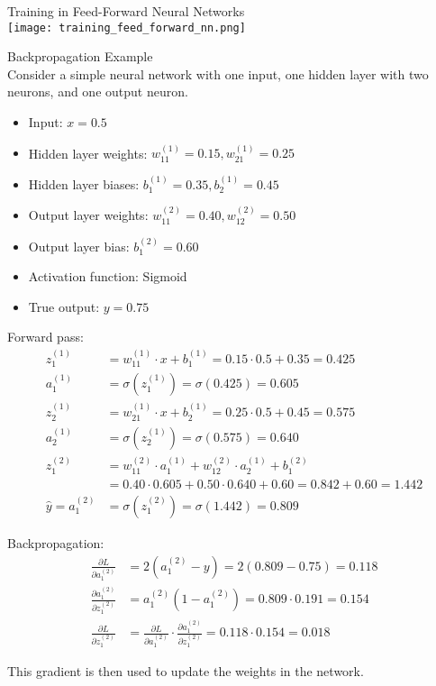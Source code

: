 \begin{theorem}{Training in Feed-Forward Neural Networks}\\
    \texttt{[image: training\_feed\_forward\_nn.png]}    
\end{theorem}

\begin{example2}{Backpropagation Example}\\
Consider a simple neural network with one input, one hidden layer with two neurons, and one output neuron.
\begin{itemize}
    \item Input: $x = 0.5$
    \item Hidden layer weights: $w^{(1)}_{11} = 0.15, w^{(1)}_{21} = 0.25$
    \item Hidden layer biases: $b^{(1)}_1 = 0.35, b^{(1)}_2 = 0.45$
    \item Output layer weights: $w^{(2)}_{11} = 0.40, w^{(2)}_{12} = 0.50$
    \item Output layer bias: $b^{(2)}_1 = 0.60$
    \item Activation function: Sigmoid
    \item True output: $y = 0.75$
\end{itemize}
\tcblower
Forward pass:
\begin{align*}
z^{(1)}_1 &= w^{(1)}_{11} \cdot x + b^{(1)}_1 = 0.15 \cdot 0.5 + 0.35 = 0.425\\
a^{(1)}_1 &= \sigma(z^{(1)}_1) = \sigma(0.425) = 0.605\\
z^{(1)}_2 &= w^{(1)}_{21} \cdot x + b^{(1)}_2 = 0.25 \cdot 0.5 + 0.45 = 0.575\\
a^{(1)}_2 &= \sigma(z^{(1)}_2) = \sigma(0.575) = 0.640\\
z^{(2)}_1 &= w^{(2)}_{11} \cdot a^{(1)}_1 + w^{(2)}_{12} \cdot a^{(1)}_2 + b^{(2)}_1\\
&= 0.40 \cdot 0.605 + 0.50 \cdot 0.640 + 0.60 = 0.842 + 0.60 = 1.442\\
\hat{y} = a^{(2)}_1 &= \sigma(z^{(2)}_1) = \sigma(1.442) = 0.809
\end{align*}

Backpropagation:
\begin{align*}
\frac{\partial L}{\partial a^{(2)}_1} &= 2(a^{(2)}_1 - y) = 2(0.809 - 0.75) = 0.118\\
\frac{\partial a^{(2)}_1}{\partial z^{(2)}_1} &= a^{(2)}_1(1 - a^{(2)}_1) = 0.809 \cdot 0.191 = 0.154\\
\frac{\partial L}{\partial z^{(2)}_1} &= \frac{\partial L}{\partial a^{(2)}_1} \cdot \frac{\partial a^{(2)}_1}{\partial z^{(2)}_1} = 0.118 \cdot 0.154 = 0.018
\end{align*}

This gradient is then used to update the weights in the network.
\end{example2}

